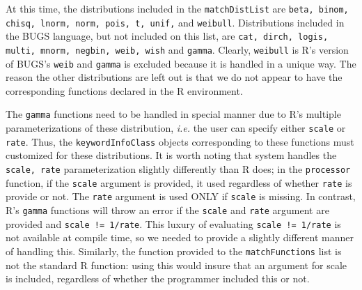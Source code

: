 \documentclass[11pt]{article}
\numberwithin{equation}{section}
\begin{document}
	At this time, the distributions included in the \texttt{matchDistList} are \texttt{beta, binom, chisq, lnorm, norm, pois, t, unif,} and \texttt{weibull}. Distributions included in the BUGS language, but not included on this list, are \texttt{cat, dirch, logis, multi, mnorm, negbin, weib, wish} and \texttt{gamma}. Clearly, \texttt{weibull} is R's version of BUGS's \texttt{weib} and \texttt{gamma} is excluded because it is handled in a unique way. The reason the other distributions are left out is that we do not appear to have the corresponding functions declared in the R environment. 
	
	The \texttt{gamma} functions need to be handled in special manner due to R's multiple parameterizations of these distribution, \emph{i.e.} the user can specify either \texttt{scale} or \texttt{rate}. Thus, the \texttt{keywordInfoClass} objects corresponding to these functions must customized for these distributions. It is worth noting that system handles the \texttt{scale, rate} parameterization slightly differently than R does; in the \texttt{processor} function, if the \texttt{scale} argument is provided, it used regardless of whether \texttt{rate} is provide or not. The \texttt{rate} argument is used ONLY if \texttt{scale} is missing. In contrast, R's \texttt{gamma} functions will throw an error if the \texttt{scale} and \texttt{rate} argument are provided and \texttt{scale != 1/rate}. This luxury of evaluating \texttt{scale != 1/rate} is not available at compile time, so we needed to provide a slightly different manner of handling this. Similarly, the function provided to the \texttt{matchFunctions} list is not the standard R function: using this would insure that an argument for scale is included, regardless of whether the programmer included this or not. 
	
 
\end{document}
